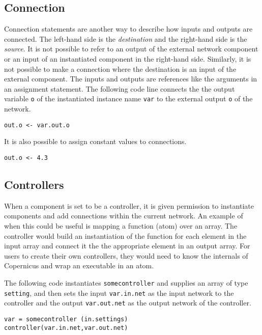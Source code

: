 \subsection{Connection}
Connection statements are another way to describe how inputs and
outputs are connected. The left-hand side is the \emph{destination}
and the right-hand side is the \emph{source}. It is not possible to
refer to an output of the external network component or an input of an
instantiated component in the right-hand side. Similarly, it is not
possible to make a connection where the destination is an input of the
external component. The inputs and outputs are references like the
arguments in an assignment statement. The following code line connects
the the output variable \verb#o# of the instantiated instance name
\verb#var# to the external output \verb#o# of the network.

\begin{verbatim}
out.o <- var.out.o
\end{verbatim}

\noindent It is also possible to assign constant values to
connections.

\begin{verbatim}
out.o <- 4.3
\end{verbatim}


\subsection{Controllers} \label{sec:control}
When a component is set to be a controller, it is given permission to
instantiate components and add connections within the current
network. An example of when this could be useful is mapping a function
(atom) over an array. The controller would build an instantiation of
the function for each element in the input array and connect it the
the appropriate element in an output array. For users to create their
own controllers, they would need to know the internals of Copernicus
and wrap an executable in an atom.

The following code instantiates \verb#somecontroller# and supplies an
array of type \verb#setting#, and then sets the input
\verb#var.in.net# as the input network to the controller and the
output \verb#var.out.net# as the output network of the controller. 

\begin{verbatim}
var = somecontroller (in.settings)
controller(var.in.net,var.out.net)
\end{verbatim}

